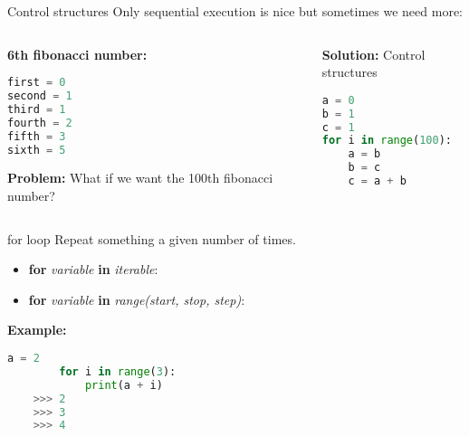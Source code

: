\documentclass{beamer}
\begin{document}
\begin{frame}[fragile]{Control structures}
    Only sequential execution is nice but sometimes we need more:
    \begin{columns}
        \begin{column}{0.49\textwidth}
            \textbf{6th fibonacci number:}
            \begin{lstlisting}[language=Python]
first = 0
second = 1
third = 1
fourth = 2
fifth = 3
sixth = 5
            \end{lstlisting}
            \textbf{Problem:} What if we want the 100th fibonacci number?
        \end{column}
        \begin{column}{.02\textwidth}
            \rule{.1mm}{0.7\textheight}
        \end{column}
        \begin{column}{0.49\textwidth}
            \textbf{Solution:} Control structures
            \begin{lstlisting}[language=Python]
a = 0
b = 1
c = 1
for i in range(100):
    a = b
    b = c
    c = a + b
            \end{lstlisting}
    
        \end{column}

    \end{columns}
    
\end{frame}

\begin{frame}[fragile]{for loop}
    Repeat something a given number of times.
    \begin{itemize}
        \item \textbf{for} \textit{variable} \textbf{in} \textit{iterable}:
        \item \textbf{for} \textit{variable} \textbf{in} \textit{range(start, stop, step)}:
    \end{itemize}\pause
    \textbf{Example:}
    \begin{lstlisting}[language=Python]
        a = 2
        for i in range(3):
            print(a + i)
    >>> 2
    >>> 3
    >>> 4
    \end{lstlisting}
    
\end{frame}
\end{document}
